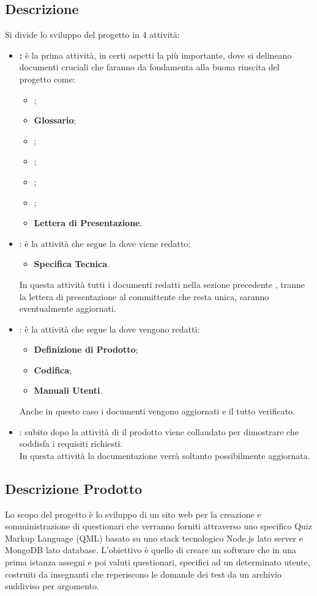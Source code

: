 \documentclass[12pt,a4paper]{article}
\begin{document}
\subsection{Descrizione}

Si divide lo sviluppo del progetto in 4 attività:
\begin{itemize}
	\item \textbf{\FA:} è la prima attività, in certi aspetti la più importante, dove si delineano documenti cruciali che faranno da fondamenta alla buona riuscita del progetto come:
	\begin{itemize}
		\item \textbf{\NdP};
		\item \textbf{Glossario};
		\item \textbf{\SdF};
		\item \textbf{\AdR};
		\item \textbf{\PdP};
		\item \textbf{\PdQ};
		\item \textbf{Lettera di Presentazione}.
	\end{itemize}
	\item \textbf{\FPA}: è la attività che segue la \textbf{\RR} dove viene redatto:
	\begin{itemize}
		\item \textbf{Specifica Tecnica}. 
	\end{itemize} 
	In questa attività tutti i documenti redatti nella sezione precedente , tranne la lettera di presentazione al committente che resta unica, saranno eventualmente aggiornati.
	\item \textbf{\FPDC}: è la attività che segue la \textbf{\RR} dove vengono redatti:
	\begin{itemize}
		\item \textbf{Definizione di Prodotto};
		\item \textbf{Codifica};
		\item \textbf{Manuali Utenti}.
	\end{itemize}
	Anche in questo caso i documenti vengono aggiornati e il tutto verificato.
	\item \textbf{\FVV}: subito dopo la attività di \textbf{\RQ} il prodotto viene collaudato per dimostrare che soddisfa i requisiti richiesti.
	\\In questa attività la documentazione verrà soltanto possibilmente aggiornata.
\end{itemize}

\subsection{Descrizione Prodotto}
Lo scopo del progetto è lo sviluppo di un sito web per la creazione e somministrazione di questionari che verranno forniti attraverso uno specifico Quiz Markup Language (QML) basato su uno stack tecnologico Node.js lato server e MongoDB lato database. L'obiettivo è quello di creare un software che in una prima istanza assegni e poi valuti questionari, specifici ad un determinato utente, costruiti da insegnanti che reperiscono le domande dei test da un archivio suddiviso per argomento.
\end{document}
